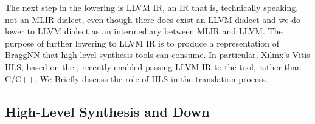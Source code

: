 The next step in the lowering is LLVM IR, an IR that is, technically speaking, not an MLIR dialect, even though there does exist an LLVM dialect and we do lower to LLVM dialect as an intermediary between MLIR and LLVM.
The purpose of further lowering to LLVM IR is to produce a representation of BraggNN that high-level synthesis tools can consume.
In particular, Xilinx's Vitis HLS, based on the , recently enabled passing LLVM IR to the tool, rather than C/C++.
We Briefly discuss the role of HLS in the translation process.

\subsection{High-Level Synthesis and Down}\label{subsec:hlsdown}

